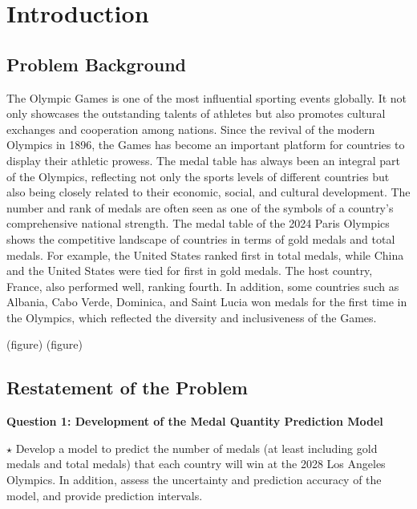 \documentclass{mcmthesis}
\renewcommand{\contentsname}{\hspace*{\fill}\Large\bfseries Contents \hspace*{\fill}}
\begin{document}
\maketitle

\tableofcontents   %
\thispagestyle{empty}

\newpage

\section{Introduction}

\subsection{Problem Background}

The Olympic Games is one of the most influential sporting events globally. It not only showcases the outstanding talents of athletes but also promotes cultural exchanges and cooperation among nations. Since the revival of the modern Olympics in 1896, the Games has become an important platform for countries to display their athletic prowess. The medal table has always been an integral part of the Olympics, reflecting not only the sports levels of different countries but also being closely related to their economic, social, and cultural development. The number and rank of medals are often seen as one of the symbols of a country's comprehensive national strength. The medal table of the 2024 Paris Olympics shows the competitive landscape of countries in terms of gold medals and total medals. For example, the United States ranked first in total medals, while China and the United States were tied for first in gold medals. The host country, France, also performed well, ranking fourth. In addition, some countries such as Albania, Cabo Verde, Dominica, and Saint Lucia won medals for the first time in the Olympics, which reflected the diversity and inclusiveness of the Games.

(figure) (figure)

\subsection{Restatement of the Problem}

{\bf Question 1: Development of the Medal Quantity Prediction Model} 

$\star$ Develop a model to predict the number of medals (at least including gold medals and total medals) that each country will win at the 2028 Los Angeles Olympics. In addition, assess the uncertainty and prediction accuracy of the model, and provide prediction intervals.
\end{document}
